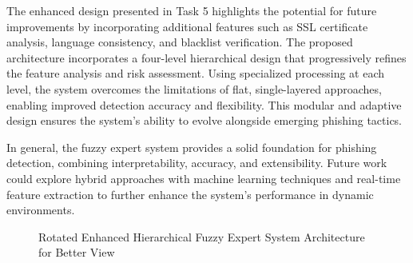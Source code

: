 \documentclass{article}
\begin{document}
The enhanced design presented in Task 5 highlights the potential for future improvements by incorporating additional features such as SSL certificate analysis, language consistency, and blacklist verification. The proposed architecture incorporates a four-level hierarchical design that progressively refines the feature analysis and risk assessment. Using specialized processing at each level, the system overcomes the limitations of flat, single-layered approaches, enabling improved detection accuracy and flexibility. This modular and adaptive design ensures the system's ability to evolve alongside emerging phishing tactics.

In general, the fuzzy expert system provides a solid foundation for phishing detection, combining interpretability, accuracy, and extensibility. Future work could explore hybrid approaches with machine learning techniques and real-time feature extraction to further enhance the system's performance in dynamic environments.

\newpage
\printbibliography

\newpage

\begin{figure}[t]
    \centering
    \caption{Rotated Enhanced Hierarchical Fuzzy Expert System Architecture for Better View}
    \label{fig:rotated_architecture}
\end{figure}
\vfill
\end{document}
